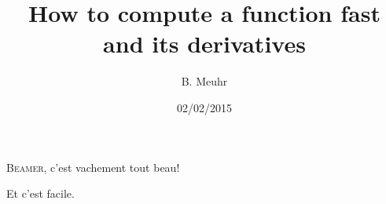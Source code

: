 





\title{How to compute a function fast and its derivatives}
\author{B. Meuhr}
\date{02/02/2015}

\begin{frame}
    \titlepage
\end{frame}

\begin{frame}
    \textsc{Beamer}, c'est vachement tout beau!
\end{frame}

\begin{frame}
    Et c'est facile.
\end{frame}



